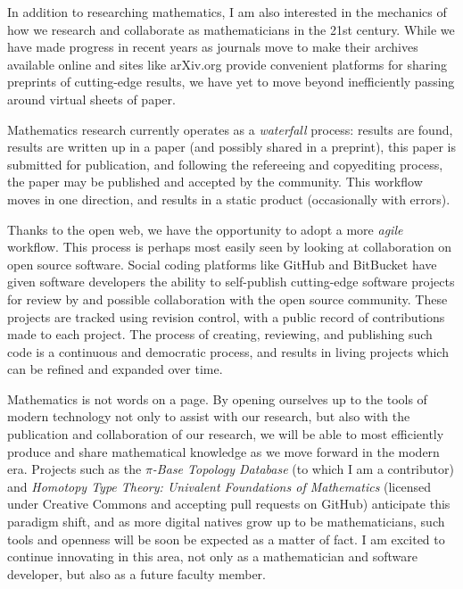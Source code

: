 \documentclass[11pt]{amsart}
\theoremstyle{plain}
\newcommand{\<}{\langle}
\renewcommand{\>}{\rangle}
\newcommand{\term}{\textit}
\begin{document}
In addition to researching mathematics, I am also interested in the mechanics
of how we research and collaborate as mathematicians in the 21st century.
While we have made progress in recent years as journals move to make their
archives available online and sites like arXiv.org provide convenient platforms
for sharing preprints of cutting-edge results, we have yet to move beyond
inefficiently passing around virtual sheets of paper.

Mathematics research currently operates as a \term{waterfall} process: results
are found, results are written up in a paper (and possibly shared in a
preprint), this paper is submitted for publication, and following the refereeing
and copyediting process, the paper may be published and accepted by the
community. This workflow moves in one direction, and results in a static
product (occasionally with errors).

Thanks to the open web, we have the opportunity to adopt a more \term{agile}
workflow. This process is perhaps most
easily seen by looking at collaboration on open source software.
Social coding platforms like GitHub and BitBucket have given software
developers the ability to self-publish cutting-edge software projects for
review by and possible collaboration with the open source community. These
projects are tracked using revision control, with a public record of
contributions made to each project. The process of creating, reviewing, and
publishing such code is a continuous and democratic process, and results
in living projects which can be refined and expanded over time.

Mathematics is not words on a page. By opening ourselves up to the tools
of modern technology not only to assist with our research, but also with
the publication and collaboration of our research, we will be able to most
efficiently produce and share mathematical knowledge as we move forward in
the modern era. Projects such as the \textit{$\pi$-Base Topology Database}
(to which I am a contributor) and
\textit{Homotopy Type Theory: Univalent Foundations of Mathematics} \cite{hottbook}
(licensed under Creative Commons and accepting pull requests on GitHub)
anticipate this paradigm shift, and as more digital
natives grow up to be mathematicians, such tools and openness will be soon be
expected as a matter of fact. I am excited to continue innovating in this area,
not only as a mathematician and software developer, but also as a future faculty
member.






\end{document}
